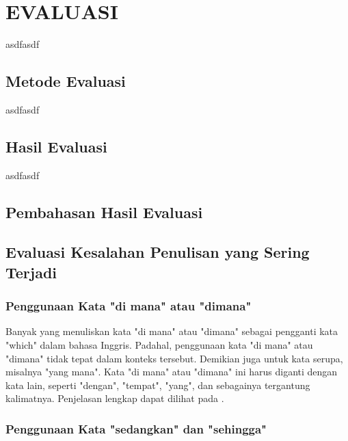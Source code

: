 \cleardoublepage
\chapter{EVALUASI}
\label{chap:evaluasi}
asdfasdf
\section{Metode Evaluasi}
asdfasdf
\section{Hasil Evaluasi}
asdfasdf
\section{Pembahasan Hasil Evaluasi}
\section{Evaluasi Kesalahan Penulisan yang Sering Terjadi}
\subsection{Penggunaan Kata "di mana" atau "dimana"}
Banyak yang menuliskan kata "di mana" atau "dimana" sebagai pengganti kata "which" dalam bahasa Inggris. 
Padahal, penggunaan kata "di mana" atau "dimana" tidak tepat dalam konteks tersebut. Demikian juga untuk kata serupa, misalnya "yang mana".
Kata "di mana" atau "dimana" ini harus diganti dengan kata lain, seperti "dengan", "tempat", "yang", dan sebagainya tergantung kalimatnya.
Penjelasan lengkap dapat dilihat pada \autocite{BPBI}.

\subsection{Penggunaan Kata "sedangkan" dan "sehingga"}

